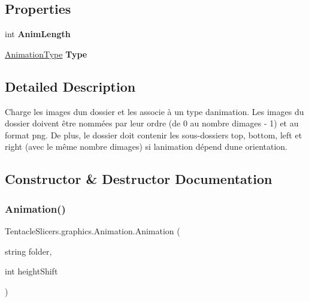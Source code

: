 \subsection*{Properties}
\begin{DoxyCompactItemize}
\item 
\mbox{\label{class_tentacle_slicers_1_1graphics_1_1_animation_a7c93e1a9e7a89bb8703cbde37b5e07ee}} 
int {\bfseries Anim\+Length}
\item 
\mbox{\label{class_tentacle_slicers_1_1graphics_1_1_animation_a6b62500cfcb7ef7a425d33a23f66e1be}} 
\hyperlink{namespace_tentacle_slicers_1_1graphics_a9c92bd633d714099730f10897a01950b}{Animation\+Type} {\bfseries Type}
\end{DoxyCompactItemize}


\subsection{Detailed Description}
Charge les images d\textquotesingle{}un dossier et les associe à un type d\textquotesingle{}animation. Les images du dossier doivent être nommées par leur ordre (de 0 au nombre d\textquotesingle{}images -\/ 1) et au format png. De plus, le dossier doit contenir les sous-\/dossiers top, bottom, left et right (avec le même nombre d\textquotesingle{}images) si l\textquotesingle{}animation dépend d\textquotesingle{}une orientation. 



\subsection{Constructor \& Destructor Documentation}
\mbox{\label{class_tentacle_slicers_1_1graphics_1_1_animation_a4534bab47880e19031ce441090405731}} 
\subsubsection{\texorpdfstring{Animation()}{Animation()}}
{\footnotesize\ttfamily Tentacle\+Slicers.\+graphics.\+Animation.\+Animation (\begin{DoxyParamCaption}\item[{string}]{folder,  }\item[{int}]{height\+Shift }\end{DoxyParamCaption})}



